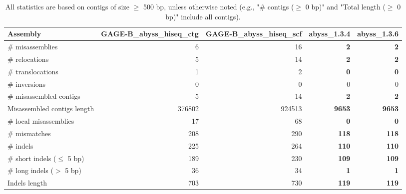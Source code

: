 \documentclass[12pt,a4paper]{article}
\begin{document}
\begin{table}[ht]
\begin{center}
\caption{All statistics are based on contigs of size $\geq$ 500 bp, unless otherwise noted (e.g., "\# contigs ($\geq$ 0 bp)" and "Total length ($\geq$ 0 bp)" include all contigs).}
\begin{tabular}{|l*{4}{|r}|}
\hline
Assembly & GAGE-B\_abyss\_hiseq\_ctg & GAGE-B\_abyss\_hiseq\_scf & abyss\_1.3.4 & abyss\_1.3.6 \\ \hline
\# misassemblies & 6 & 16 & {\bf 2} & {\bf 2} \\ \hline
\hspace{5mm}\# relocations & 5 & 14 & {\bf 2} & {\bf 2} \\ \hline
\hspace{5mm}\# translocations & 1 & 2 & {\bf 0} & {\bf 0} \\ \hline
\hspace{5mm}\# inversions & 0 & 0 & 0 & 0 \\ \hline
\# misassembled contigs & 5 & 14 & {\bf 2} & {\bf 2} \\ \hline
Misassembled contigs length & 376802 & 924513 & {\bf 9653} & {\bf 9653} \\ \hline
\# local misassemblies & 17 & 68 & {\bf 0} & {\bf 0} \\ \hline
\# mismatches & 208 & 290 & {\bf 118} & {\bf 118} \\ \hline
\# indels & 225 & 264 & {\bf 110} & {\bf 110} \\ \hline
\hspace{5mm}\# short indels ($\leq$ 5 bp) & 189 & 230 & {\bf 109} & {\bf 109} \\ \hline
\hspace{5mm}\# long indels ($>$ 5 bp) & 36 & 34 & {\bf 1} & {\bf 1} \\ \hline
Indels length & 703 & 730 & {\bf 119} & {\bf 119} \\ \hline
\end{tabular}
\end{center}
\end{table}
\end{document}
